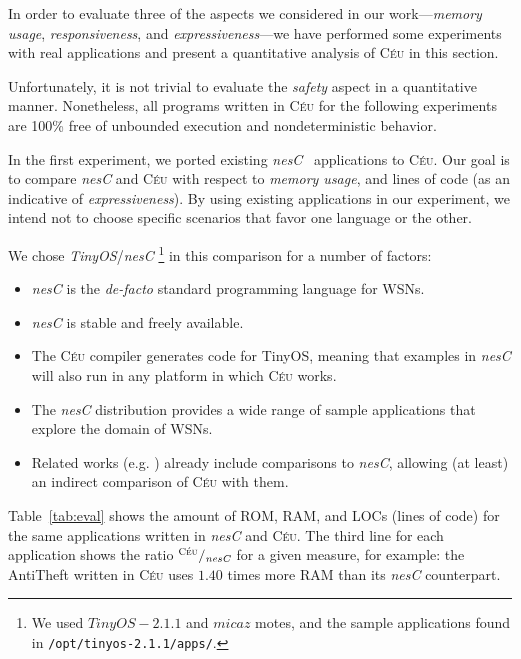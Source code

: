 \documentclass{sig-alternate-ipsn09}
\newcommand{\2}{\;\;}
\newcommand{\5}{\;\;\;\;\;}
\newcommand{\CEU}{\textsc{C\'{e}u}}
\newcommand{\nesc}{\emph{nesC}}
\newcommand{\code}[1] {{\small{\texttt{#1}}}}
\begin{document}

In order to evaluate three of the aspects we considered in our 
work---\emph{memory usage}, \emph{responsiveness}, and 
\emph{expressiveness}---we have performed some experiments with real 
applications and present a quantitative analysis of \CEU{} in this section.

Unfortunately, it is not trivial to evaluate the \emph{safety} aspect in a 
quantitative manner.
Nonetheless, all programs written in \CEU{} for the following experiments are 
100\% free of unbounded execution and nondeterministic behavior.

In the first experiment, we ported existing \nesc{}~\cite{wsn.nesc} 
applications to \CEU.
Our goal is to compare \nesc{} and \CEU{} with respect to \emph{memory usage}, 
and lines of code (as an indicative of \emph{expressiveness}).
By using existing applications in our experiment, we intend not to choose 
specific scenarios that favor one language or the other.

We chose \emph{TinyOS}/\nesc{}%
\footnote {
    We used $TinyOS-2.1.1$ and $micaz$ motes, and the sample applications found 
in \code{/opt/tinyos-2.1.1/apps/}.
}
in this comparison for a number of factors:

\begin{itemize}
\setlength{\itemsep}{0pt}
    \item \nesc{} is the \emph{de-facto} standard programming language for WSNs.
    \item \nesc{} is stable and freely available.
    \item The \CEU{} compiler generates code for TinyOS, meaning that examples 
            in \nesc{} will also run in any platform in which \CEU{} works.
    \item The \nesc{} distribution provides a wide range of sample applications 
            that explore the domain of WSNs.
    \item Related works (e.g. \cite{wsn.protothreads,wsn.sol,wsn.flask}) 
            already include comparisons to \nesc, allowing (at least) an 
indirect comparison of \CEU{} with them.
\end{itemize}

\newcommand{\fr}{{\small$^{\CEU}/_{\nesc}$}}
\newcommand{\s}[1]{{\small \textbf{#1}}}

Table~\ref{tab:eval} shows the amount of ROM, RAM, and LOCs (lines of code) for 
the same applications written in \nesc{} and \CEU{}.
The third line for each application shows the ratio \fr{} for a given measure, 
for example: the AntiTheft written in \CEU{} uses $1.40$ times more RAM than 
its \nesc{} counterpart.
\end{document}
